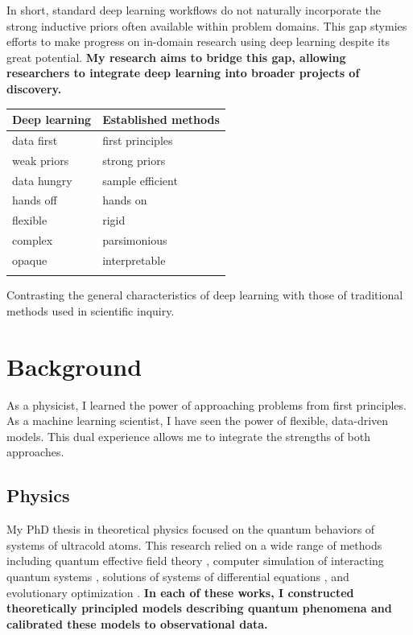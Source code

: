 \documentclass{tufte-handout}
\begin{document}
In short, standard deep learning workflows do not naturally incorporate the strong inductive priors often available within problem domains. This gap stymies efforts to make progress on in-domain research using deep learning despite its great potential. {\bf My research aims to bridge this gap, allowing researchers to integrate deep learning into broader projects of discovery.}

\begin{margintable}
  \centering
  \selectfont
  \begin{tabular}{ll}
    \toprule
    Deep learning & Established methods \\
    \midrule
    data first    & first principles    \\
    weak priors   & strong priors       \\
    data hungry   & sample efficient    \\
    hands off     & hands on            \\
    flexible      & rigid               \\
    complex       & parsimonious        \\
    opaque        & interpretable       \\
    \bottomrule                         \\
  \end{tabular}
  \caption{Contrasting the general characteristics of deep learning with those of traditional methods used in scientific inquiry.}
  \label{tab:bigpicture}
\end{margintable}

\section{Background}
As a physicist, I learned the power of approaching problems from first principles. As a machine learning scientist, I have seen the power of flexible, data-driven models. This dual experience allows me to integrate the strengths of both approaches.

\subsection{Physics}
My PhD thesis in theoretical physics focused on the quantum behaviors of systems of ultracold atoms. This research relied on a wide range of methods including quantum effective field theory  \citep{smith2015inducing}, computer simulation of interacting quantum systems \citep{langmack2012avalanche}, solutions of systems of differential equations \citep{braaten2014born}, and evolutionary optimization \citep{smith2019engineering}. {\bf In each of these works, I constructed theoretically principled models describing quantum phenomena and calibrated these models to observational data.}
\end{document}
